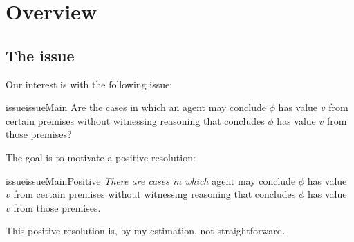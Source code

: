 \chapter{Overview}
\label{cha:overview}

\section{The issue}
\label{sec:issue}

\begin{note}
  Our interest is with the following issue:

  \begin{restatable}[Main]{issue}{issueMain}
    \label{issue:Main}
    Are the cases in which an agent may conclude \(\phi\) has value \(v\) from certain premises without witnessing reasoning that concludes \(\phi\) has value \(v\) from those premises?
  \end{restatable}

  The goal is to motivate a positive resolution:

  \begin{restatable}{issue}{issueMainPositive}
    \label{issue:Main:R:p}
    \emph{There are cases in which} agent may conclude \(\phi\) has value \(v\) from certain premises without witnessing reasoning that concludes \(\phi\) has value \(v\) from those premises.
  \end{restatable}

  This positive resolution is, by my estimation, not straightforward.
\end{note}

